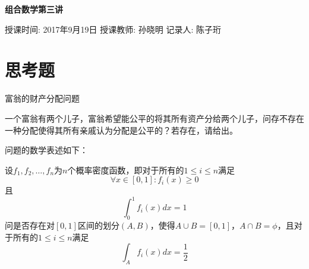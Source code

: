 ﻿\documentclass[11pt]{article}
\begin{document}
    \pagestyle{fancy}
    \chead{}

    \begin{center}
        {\LARGE \bf 组合数学第三讲}\\
    \end{center}
        \begin{kaishu}
            授课时间: 2017年9月19日\quad
            授课教师: 孙晓明
            \hfill 记录人: 陈子珩
        \end{kaishu}


    \section{思考题}

    \heiti 富翁的财产分配问题

    \songti 一个富翁有两个儿子，富翁希望能公平的将其所有资产分给两个儿子，问存不存在一种分配使得其所有亲戚认为分配是公平的？若存在，请给出。


    \heiti 问题的数学表述如下：

    \songti 设$f_1, f_2, \dots , f_n$为$n$个概率密度函数，即对于所有的$1\le i\le n$满足
        \[
            \forall x \in [0,1]: f_i (x)\ge 0
        \]
        且
        \[
            \int_0^1 f_i (x)dx = 1
        \]
        问是否存在对$[0,1]$区间的划分$(A,B)$，使得$A\cup B=[0,1]$，$A\cap B=\phi$，且对于所有的$1\le i\le n$满足
        \[
            \int_A f_i (x)dx = \frac{1}{2}
        \]
\end{document}
